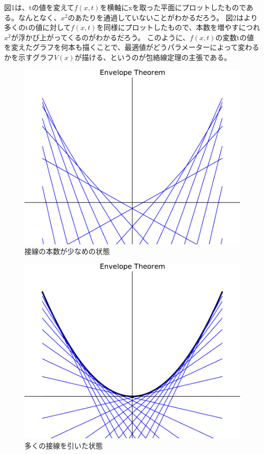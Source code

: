 \documentclass[11pt,a4j,fleqn]{jarticle}
\begin{document}
図1は、tの値を変えて$f(x,t)$を横軸にxを取った平面にプロットしたものである。なんとなく、$x^2$のあたりを通過していないことがわかるだろう。
図2はより多くのtの値に対して$f(x,t)$を同様にプロットしたもので、本数を増やすにつれ$x^2$が浮かび上がってくるのがわかるだろう。
このように、$f(x,t)$の変数tの値を変えたグラフを何本も描くことで、最適値がどうパラメーターによって変わるかを示すグラフ$V(x)$が描ける、というのが包絡線定理の主張である。

\begin{figure}[!p]
\begin{center}
\includegraphics[scale=0.6]{envelope1.pdf}
\end{center}
\caption{接線の本数が少なめの状態}
\label{fig:1}
\end{figure}

\begin{figure}
\begin{center}
\includegraphics[scale=0.6]{envelope0.pdf}
\end{center}
\caption{多くの接線を引いた状態}
\label{fig:2}
\end{figure}
\end{document}
